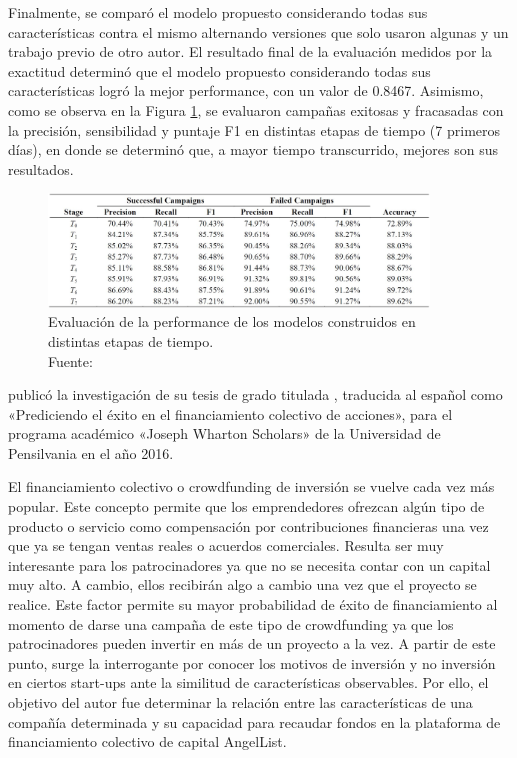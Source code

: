 Finalmente, se comparó el modelo propuesto considerando todas sus características contra el mismo alternando versiones que solo usaron algunas y un trabajo previo de otro autor. El resultado final de la evaluación medidos por la exactitud determinó que el modelo propuesto considerando todas sus características logró la mejor performance, con un valor de 0.8467. Asimismo, como se observa en la Figura \ref{2:fig114}, se evaluaron campañas exitosas y fracasadas con la precisión, sensibilidad y puntaje F1 en distintas etapas de tiempo (7 primeros días), en donde se determinó que, a mayor tiempo transcurrido, mejores son sus resultados.

\begin{figure}[!ht]
	\begin{center}
		\includegraphics[width=0.90\textwidth]{2/figures/chen2015.jpg}
		\caption[Evaluación de la performance de los modelos construidos en distintas etapas de tiempo]{Evaluación de la performance de los modelos construidos en distintas etapas de tiempo.\\
			Fuente: \cite{pr_chen2015predcrowd}}
		\label{2:fig114}
	\end{center}
\end{figure}

\cite{pr_beckwith2016predcrowd} publicó la investigación de su tesis de grado titulada , traducida al español como «Prediciendo el éxito en el financiamiento colectivo de acciones», para el programa académico «Joseph Wharton Scholars» de la Universidad de Pensilvania en el año 2016.

El financiamiento colectivo o crowdfunding de inversión se vuelve cada vez más popular. Este concepto permite que los emprendedores ofrezcan algún tipo de producto o servicio como compensación por contribuciones financieras una vez que ya se tengan ventas reales o acuerdos comerciales. Resulta ser muy interesante para los patrocinadores ya que no se necesita contar con un capital muy alto. A cambio, ellos recibirán algo a cambio una vez que el proyecto se realice. Este factor permite su mayor probabilidad de éxito de financiamiento al momento de darse una campaña de este tipo de crowdfunding ya que los patrocinadores pueden invertir en más de un proyecto a la vez. A partir de este punto, surge la interrogante por conocer los motivos de inversión y no inversión en ciertos start-ups ante la similitud de características observables. Por ello, el objetivo del autor fue determinar la relación entre las características de una compañía determinada y su capacidad para recaudar fondos en la plataforma de financiamiento colectivo de capital AngelList.

